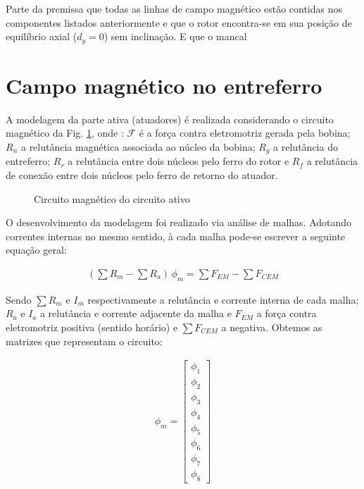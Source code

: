 Parte da premissa que todas as linhas de campo magnético estão contidas nos componentes listados anteriormente e que o rotor encontra-se em sua posição de equilíbrio axial ($d_y = 0$) sem inclinação. E que o mancal 

\section{Campo magnético no entreferro}

A modelagem da parte ativa (atuadores) é realizada considerando o circuito magnético da Fig. \ref{Fig:modelagem:ativo:circuito2}, onde : $\mathcal{F}$ é a força contra eletromotriz gerada pela bobina; $R_n$ a relutância magnética associada ao núcleo da bobina; $R_g$ a relutância do entreferro; $R_r$ a relutância entre dois núcleos pelo ferro do rotor e $R_f$ a relutância de conexão entre dois núcleos pelo ferro de retorno do atuador.

\begin{figure}[h!]
	
	\label{Fig:modelagem:ativo:circuito2}
	\caption{Circuito magnético do circuito ativo}
\end{figure}

O desenvolvimento da modelagem foi realizado via análise de malhas. Adotando correntes internas no mesmo sentido, à cada malha pode-se escrever a seguinte equação geral:

\begin{align}
	(\sum R_m  - \sum  R_a ) \, \phi_m = \sum F_{EM} - \sum F_{CEM}
\end{align}

Sendo $\sum R_m$ e $I_m$  respectivamente a relutância e corrente interna de cada malha; $R_a$ e $I_{a}$ a relutância e corrente adjacente da malha e $F_{EM}$ a força contra eletromotriz positiva (sentido horário) e $\sum F_{CEM}$ a negativa. Obtemos as matrizes que representam o circuito:

\begin{align}
	\phi_m = 
	\begin{bmatrix}
	\phi_1 \\ \phi_2 \\  \phi_3 \\  \phi_4 \\  \phi_5 \\  \phi_6 \\  \phi_7 \\  \phi_8
	\end{bmatrix}
\end{align}

